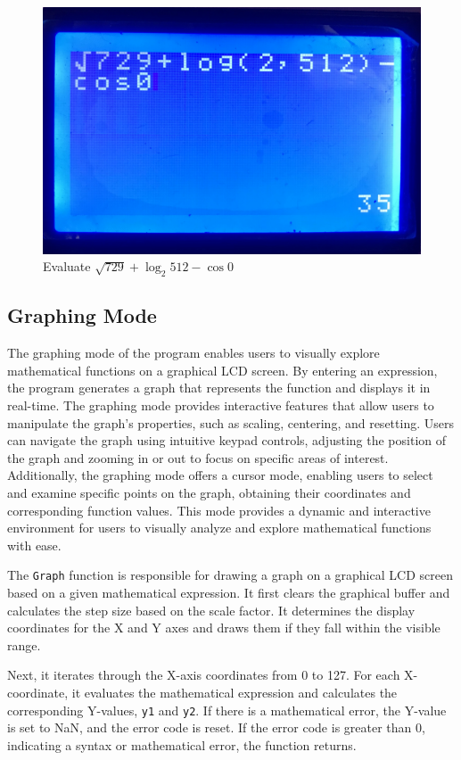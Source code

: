 \documentclass[a4paper, twoside]{report}
\begin{document}
\begin{figure}[H]
    \centering
    \includegraphics[width=.7\textwidth]{LCDScreens/mathmode.jpeg}
    \caption{Evaluate $\sqrt{729} + \log_2 512 - \cos0$}
\end{figure}

\subsection{Graphing Mode}
The graphing mode of the program enables users to visually explore mathematical functions on a graphical LCD screen. By entering an expression, the program generates a graph that represents the function and displays it in real-time. The graphing mode provides interactive features that allow users to manipulate the graph's properties, such as scaling, centering, and resetting. Users can navigate the graph using intuitive keypad controls, adjusting the position of the graph and zooming in or out to focus on specific areas of interest. Additionally, the graphing mode offers a cursor mode, enabling users to select and examine specific points on the graph, obtaining their coordinates and corresponding function values. This mode provides a dynamic and interactive environment for users to visually analyze and explore mathematical functions with ease.

The \texttt{Graph} function is responsible for drawing a graph on a graphical LCD screen based on a given mathematical expression. It first clears the graphical buffer and calculates the step size based on the scale factor. It determines the display coordinates for the X and Y axes and draws them if they fall within the visible range.

Next, it iterates through the X-axis coordinates from 0 to 127. For each X-coordinate, it evaluates the mathematical expression and calculates the corresponding Y-values, \texttt{y1} and \texttt{y2}. If there is a mathematical error, the Y-value is set to NaN, and the error code is reset. If the error code is greater than 0, indicating a syntax or mathematical error, the function returns.
\end{document}
